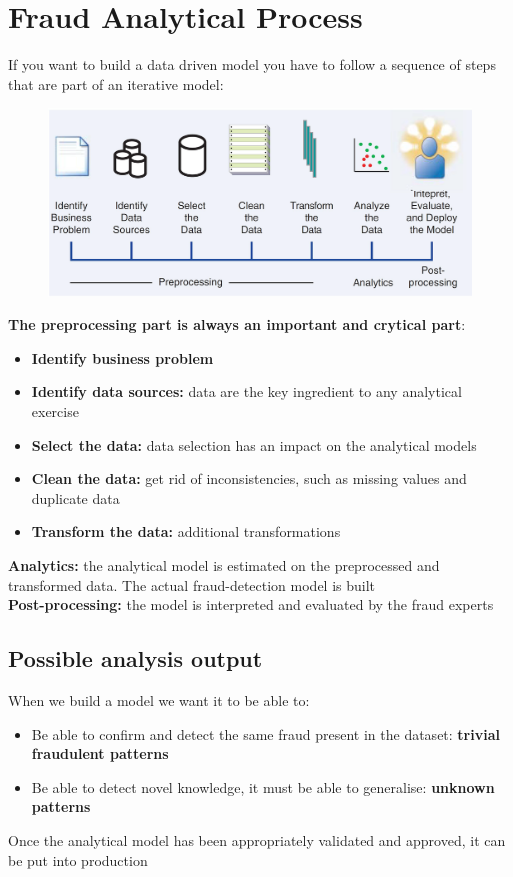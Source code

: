 \section{Fraud Analytical Process}
    If you want to build a data driven model you have to follow a sequence of steps that are part of an iterative model:
    \begin{figure}[ht!]
        \centering
        \includegraphics[width=0.6\linewidth]{process.png}
    \end{figure}
    \textbf{The preprocessing part is always an important and crytical part}:
    \begin{itemize}
        \item \textbf{Identify business problem}
        \item \textbf{Identify data sources:} data are the key ingredient to any analytical exercise
        \item \textbf{Select the data:} data selection has an impact on the analytical models
        \item \textbf{Clean the data:} get rid of inconsistencies, such as missing values and duplicate data 
        \item \textbf{Transform the data:} additional transformations
    \end{itemize}
    \textbf{Analytics:} the analytical model is estimated on the preprocessed and transformed data. The actual fraud-detection model is built\\
    \textbf{Post-processing:} the model is interpreted and evaluated by the fraud experts
    \subsection{Possible analysis output}
        When we build a model we want it to be able to:
        \begin{itemize}
            \item Be able to confirm and detect the same fraud present in the dataset: \textbf{trivial fraudulent patterns}
            \item Be able to detect novel knowledge, it must be able to generalise: \textbf{unknown patterns}
        \end{itemize}
        Once the analytical model has been appropriately validated and approved, it can be put into production
